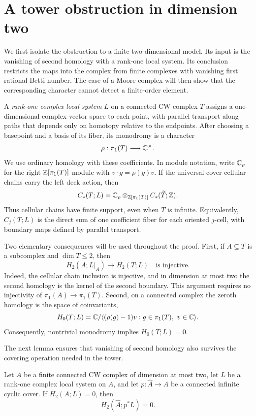 \section{A tower obstruction in dimension two}
\label{sec:tower}

We first isolate the obstruction to a finite two-dimensional model.
Its input is the vanishing of second homology with a rank-one local
system.  Its conclusion restricts the maps into the complex from finite
complexes with vanishing first rational Betti number.  The case of a
Moore complex will then show that the corresponding character cannot
detect a finite-order element.

A \emph{rank-one complex local system} $L$ on a connected CW complex $T$
assigns a one-dimensional complex vector space to each point, with
parallel transport along paths that depends only on homotopy relative to
the endpoints.  After choosing a basepoint and a basis of its fiber,
its monodromy is a character
\[
  \rho:\pi_1(T)\longrightarrow\mathbb C^\times.
\]
We use ordinary homology with these coefficients.  In module notation,
write $\mathbb C_\rho$ for the right $\mathbb Z[\pi_1(T)]$-module with
$v\cdot g=\rho(g)v$.  If the universal-cover cellular chains carry the
left deck action, then
\[
  C_*(T;L)
  =\mathbb C_\rho\otimes_{\mathbb Z[\pi_1(T)]}C_*(\widetilde T;\mathbb Z).
\]
Thus cellular chains have finite support, even when $T$ is infinite.
Equivalently, $C_j(T;L)$ is the direct sum of one coefficient fiber for
each oriented $j$-cell, with boundary maps defined by parallel transport.

Two elementary consequences will be used throughout the proof.  First,
if $A\subseteq T$ is a subcomplex and $\dim T\leq2$, then
\begin{equation}
  H_2(A;L|_A)\longrightarrow H_2(T;L)
  \quad\text{is injective}.
  \label{eq:subcomplex-injection}
\end{equation}
Indeed, the cellular chain inclusion is injective, and in dimension at
most two the second homology is the kernel of the second boundary.
This argument requires no injectivity of $\pi_1(A)\to\pi_1(T)$.
Second, on a connected complex the zeroth homology is the space of
coinvariants,
\[
  H_0(T;L)
  =\mathbb C/\langle (\rho(g)-1)v:g\in\pi_1(T),\ v\in\mathbb C\rangle.
\]
Consequently, nontrivial monodromy implies $H_0(T;L)=0$.

The next lemma ensures that vanishing of second homology also survives
the covering operation needed in the tower.

\begin{lemma}
\label{lem:cyclic-cover}
Let $A$ be a finite connected CW complex of dimension at most two, let
$L$ be a rank-one complex local system on $A$, and let
$p:\widehat A\to A$ be a connected infinite cyclic cover.  If
$H_2(A;L)=0$, then
\[
  H_2(\widehat A;p^*L)=0.
\]
\end{lemma}

